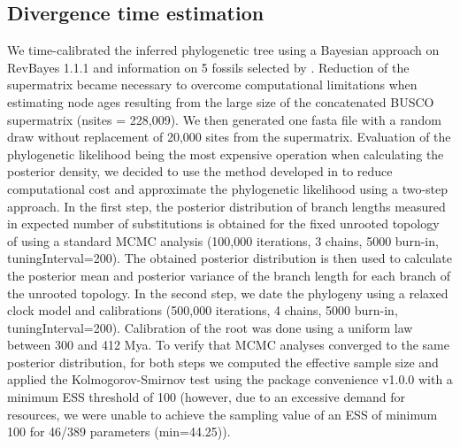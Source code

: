 \subsection{Divergence time estimation}
\label{sec:MM-10}
We time-calibrated the inferred phylogenetic tree using a Bayesian approach on RevBayes 1.1.1 \citep{hohna_probabilistic_2014} and information on 5 fossils selected by \citep{peters_evolutionary_2017}. Reduction of the supermatrix became necessary to overcome computational limitations when estimating node ages resulting from the large size of the concatenated BUSCO supermatrix (nsites = 228,009). We then generated one fasta file with a random draw without replacement of 20,000 sites from the supermatrix.
Evaluation of the phylogenetic likelihood being the most expensive operation when calculating the posterior density, we decided to use the method developed in \citep{szollosi_relative_2020} to reduce computational cost and approximate the phylogenetic likelihood using a two-step approach. In the first step, the posterior distribution of branch lengths measured in expected number of substitutions is obtained for the fixed unrooted topology of using a standard MCMC analysis (100,000 iterations, 3 chains, 5000 burn-in, tuningInterval=200). The obtained posterior distribution is then used to calculate the posterior mean and posterior variance of the branch length for each branch of the unrooted topology. In the second step, we date the phylogeny using a relaxed clock model and calibrations (500,000 iterations, 4 chains, 5000 burn-in, tuningInterval=200). Calibration of the root was done using a uniform law between 300 and 412 Mya. To verify that MCMC analyses converged to the same posterior distribution,
for both steps we computed the effective sample size and applied the Kolmogorov-Smirnov test using the package convenience v1.0.0 with a minimum ESS threshold of 100 (however, due to an excessive demand for resources, we were unable to achieve the sampling value of an ESS of minimum 100 for 46/389 parameters (min=44.25)).

